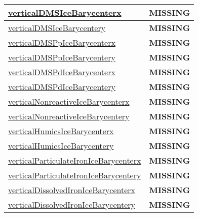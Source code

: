 {\begin{center}
\begin{longtable}{| p{2.0in} | p{4.0in} |}
    \hline
    \hyperref[subsec:var_sec_tracer_barycenter_verticalDMSIceBarycenterx]{verticalDMSIceBarycenterx} & {\bf \color{red} MISSING} \\
    \hline
    \hyperref[subsec:var_sec_tracer_barycenter_verticalDMSIceBarycentery]{verticalDMSIceBarycentery} & {\bf \color{red} MISSING} \\
    \hline
    \hyperref[subsec:var_sec_tracer_barycenter_verticalDMSPpIceBarycenterx]{verticalDMSPpIceBarycenterx} & {\bf \color{red} MISSING} \\
    \hline
    \hyperref[subsec:var_sec_tracer_barycenter_verticalDMSPpIceBarycentery]{verticalDMSPpIceBarycentery} & {\bf \color{red} MISSING} \\
    \hline
    \hyperref[subsec:var_sec_tracer_barycenter_verticalDMSPdIceBarycenterx]{verticalDMSPdIceBarycenterx} & {\bf \color{red} MISSING} \\
    \hline
    \hyperref[subsec:var_sec_tracer_barycenter_verticalDMSPdIceBarycentery]{verticalDMSPdIceBarycentery} & {\bf \color{red} MISSING} \\
    \hline
    \hyperref[subsec:var_sec_tracer_barycenter_verticalNonreactiveIceBarycenterx]{verticalNonreactiveIceBarycenterx} & {\bf \color{red} MISSING} \\
    \hline
    \hyperref[subsec:var_sec_tracer_barycenter_verticalNonreactiveIceBarycentery]{verticalNonreactiveIceBarycentery} & {\bf \color{red} MISSING} \\
    \hline
    \hyperref[subsec:var_sec_tracer_barycenter_verticalHumicsIceBarycenterx]{verticalHumicsIceBarycenterx} & {\bf \color{red} MISSING} \\
    \hline
    \hyperref[subsec:var_sec_tracer_barycenter_verticalHumicsIceBarycentery]{verticalHumicsIceBarycentery} & {\bf \color{red} MISSING} \\
    \hline
    \hyperref[subsec:var_sec_tracer_barycenter_verticalParticulateIronIceBarycenterx]{verticalParticulateIronIce\-Barycenterx} & {\bf \color{red} MISSING} \\
    \hline
    \hyperref[subsec:var_sec_tracer_barycenter_verticalParticulateIronIceBarycentery]{verticalParticulateIronIce\-Barycentery} & {\bf \color{red} MISSING} \\
    \hline
    \hyperref[subsec:var_sec_tracer_barycenter_verticalDissolvedIronIceBarycenterx]{verticalDissolvedIronIce\-Barycenterx} & {\bf \color{red} MISSING} \\
    \hline
    \hyperref[subsec:var_sec_tracer_barycenter_verticalDissolvedIronIceBarycentery]{verticalDissolvedIronIce\-Barycentery} & {\bf \color{red} MISSING} \\

\end{longtable}
\end{center}}
